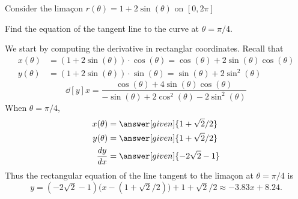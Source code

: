 \documentclass{ximera}
\begin{document}
\begin{example}
  Consider the lima\c con $r(\theta) =1+2\sin(\theta)$ on $[0,2\pi]$
  \begin{image}
  \end{image}
  Find the equation of the tangent line to the curve at
  $\theta=\pi/4$.
  \begin{explanation}
    We start by computing the derivative in rectanglar coordinates. Recall that
    \begin{align*}
      x(\theta) &= \left(1+2\sin(\theta)\right)\cdot \cos(\theta) = \cos(\theta)+2\sin(\theta)\cos(\theta)\\
      y(\theta) &= \left(1+2\sin(\theta)\right)\cdot \sin(\theta) = \sin(\theta)+2\sin^2(\theta)
    \end{align*}
    \[
    \dd[y]{x} = \frac{\cos(\theta) + 4\sin(\theta)\cos(\theta)}{-\sin(\theta) + 2\cos^2(\theta)-2\sin^2(\theta)}
    \]
    When $\theta=\pi/4$,
    \begin{align*}
      x(\theta) &= \answer[given]{1+\sqrt{2}/2}\\
      y(\theta) &=\answer[given]{1+\sqrt{2}/2}\\
    \frac{dy}{dx} &=\answer[given]{-2\sqrt{2}-1}
    \end{align*}
     Thus the rectangular equation of the line tangent to the lima\c con at $\theta=\pi/4$ is
    \[
    y=(-2\sqrt{2}-1)\big(x-(1+\sqrt{2}/2)\big)+1+\sqrt{2}/2 \approx  -3.83 x+8.24.
    \]
    \begin{prompt}
    \end{prompt}
  \end{explanation}
\end{example}
\end{document}
